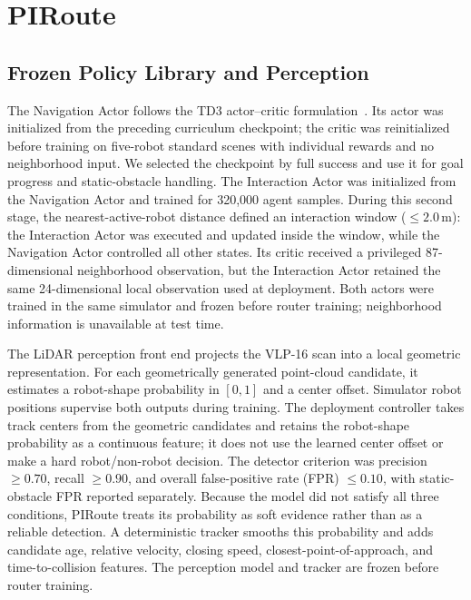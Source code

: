 \documentclass[letterpaper,10pt,conference]{ieeeconf}
\newcommand{\method}{PIRoute}
\begin{document}
\section{PIRoute}
\subsection{Frozen Policy Library and Perception}
The Navigation Actor follows the TD3 actor--critic formulation~\cite{fujimoto2018td3}. Its actor was initialized from the preceding curriculum checkpoint; the critic was reinitialized before training on five-robot standard scenes with individual rewards and no neighborhood input. We selected the checkpoint by full success and use it for goal progress and static-obstacle handling. The Interaction Actor was initialized from the Navigation Actor and trained for 320,000 agent samples. During this second stage, the nearest-active-robot distance defined an interaction window ($\leq 2.0$\,m): the Interaction Actor was executed and updated inside the window, while the Navigation Actor controlled all other states. Its critic received a privileged 87-dimensional neighborhood observation, but the Interaction Actor retained the same 24-dimensional local observation used at deployment. Both actors were trained in the same simulator and frozen before router training; neighborhood information is unavailable at test time.

The LiDAR perception front end projects the VLP-16 scan into a local geometric representation. For each geometrically generated point-cloud candidate, it estimates a robot-shape probability in $[0,1]$ and a center offset. Simulator robot positions supervise both outputs during training. The deployment controller takes track centers from the geometric candidates and retains the robot-shape probability as a continuous feature; it does not use the learned center offset or make a hard robot/non-robot decision. The detector criterion was precision $\geq 0.70$, recall $\geq 0.90$, and overall false-positive rate (FPR) $\leq 0.10$, with static-obstacle FPR reported separately. Because the model did not satisfy all three conditions, \method{} treats its probability as soft evidence rather than as a reliable detection. A deterministic tracker smooths this probability and adds candidate age, relative velocity, closing speed, closest-point-of-approach, and time-to-collision features. The perception model and tracker are frozen before router training.
\end{document}
